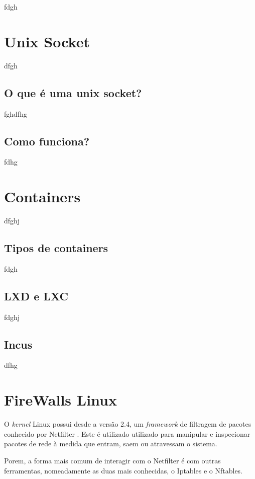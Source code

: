 fdgh

\section{Unix Socket}

dfgh

\subsection{O que é uma unix socket?}

fghdfhg

\subsection{Como funciona?}

fdhg


\section{Containers}

dfghj

\subsection{Tipos de containers}

fdgh

\subsection{LXD e LXC}

fdghj

\subsection{Incus}

dfhg

\section{FireWalls Linux}

O \textit{kernel} Linux possui desde a versão 2.4, um \textit{framework} de filtragem de pacotes 
conhecido por Netfilter \cite{netfilter}. Este é utilizado utilizado para manipular e inspecionar 
pacotes de rede à medida que entram, saem ou atravessam o sistema.

Porem, a forma mais comum de interagir com o Netfilter é com outras ferramentas,
nomeadamente as duas mais conhecidas, o Iptables e o Nftables.

